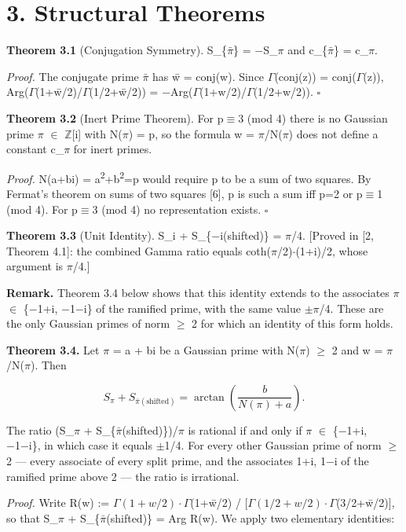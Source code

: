 \documentclass[11pt]{article}
\begin{document}
\hypertarget{structural-theorems}{%
\section{3. Structural Theorems}\label{structural-theorems}}

\textbf{Theorem 3.1} (Conjugation Symmetry). S\_\{\(\bar{\pi}\)\} =
−S\_\(\pi\) and \textbar c\_\{\(\bar{\pi}\)\}\textbar{} =
\textbar c\_\(\pi\)\textbar.

\emph{Proof.} The conjugate prime \(\bar{\pi}\) has w̄ = conj(w). Since
\(\Gamma\)(conj(z)) = conj(\(\Gamma\)(z)),
Arg(\(\Gamma\)(1+w̄/2)/\(\Gamma\)(1/2+w̄/2)) =
−Arg(\(\Gamma\)(1+w/2)/\(\Gamma\)(1/2+w/2)). \(\square\)

\textbf{Theorem 3.2} (Inert Prime Theorem). For p\(\equiv\)3 (mod 4)
there is no Gaussian prime \(\pi\) \(\in\) \(\mathbb{Z}\){[}i{]} with
N(\(\pi\)) = p, so the formula w = \(\pi\)/N(\(\pi\)) does not define a
constant c\_\(\pi\) for inert primes.

\emph{Proof.} N(a+bi) = a\textsuperscript{2}+b\textsuperscript{2}=p
would require p to be a sum of two squares. By Fermat's theorem on sums
of two squares {[}6{]}, p is such a sum iff p=2 or p\(\equiv\)1 (mod 4).
For p\(\equiv\)3 (mod 4) no representation exists. \(\square\)

\textbf{Theorem 3.3} (Unit Identity). S\_i + S\_\{−i(shifted)\} =
\(\pi\)/4. {[}Proved in {[}2, Theorem 4.1{]}: the combined Gamma ratio
equals coth(\(\pi\)/2)\(\cdot\)(1+i)/2, whose argument is \(\pi\)/4.{]}

\textbf{Remark.} Theorem 3.4 below shows that this identity extends to
the associates \(\pi\) \(\in\) \{−1+i, −1−i\} of the ramified prime,
with the same value \(\pm \pi\)/4. These are the only Gaussian primes of
norm \(\geq\) 2 for which an identity of this form holds.

\textbf{Theorem 3.4.} Let \(\pi\) = a + bi be a Gaussian prime with
N(\(\pi\)) \(\geq\) 2 and w = \(\pi\)/N(\(\pi\)). Then

\[S_\pi + S_{\bar\pi(\text{shifted})} = \arctan\!\left(\frac{b}{N(\pi) + a}\right).\]

The ratio (S\_\(\pi\) + S\_\{\(\bar{\pi}\)(shifted)\})/\(\pi\) is
rational if and only if \(\pi\) \(\in\) \{−1+i, −1−i\}, in which case it
equals \(\pm\)1/4. For every other Gaussian prime of norm \(\geq\) 2 ---
every associate of every split prime, and the associates 1+i, 1−i of the
ramified prime above 2 --- the ratio is irrational.

\emph{Proof.} Write R(w) := \(\Gamma(1+w/2)\cdot \Gamma\)(1+w̄/2) /
{[}\(\Gamma(1/2+w/2)\cdot \Gamma\)(3/2+w̄/2){]}, so that S\_\(\pi\) +
S\_\{\(\bar{\pi}\)(shifted)\} = Arg R(w). We apply two elementary
identities:
\end{document}
